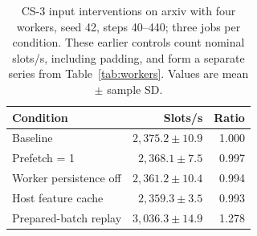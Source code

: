 \begin{table}[t]
  \centering
  \small
  \setlength{\tabcolsep}{4pt}
  \caption{CS-3 input interventions on arxiv with four workers, seed 42, steps 40--440; three jobs per condition. These earlier controls count nominal slots/s, including padding, and form a separate series from Table~\ref{tab:workers}. Values are mean $\pm$ sample SD.}
  \label{tab:interventions}
  \begin{tabular}{@{}lrr@{}}
    \hline
    Condition & Slots/s & Ratio \\
    \hline
    Baseline & $2,375.2 \pm 10.9$ & 1.000 \\
    Prefetch = 1 & $2,368.1 \pm 7.5$ & 0.997 \\
    Worker persistence off & $2,361.2 \pm 10.4$ & 0.994 \\
    Host feature cache & $2,359.3 \pm 3.5$ & 0.993 \\
    Prepared-batch replay & $3,036.3 \pm 14.9$ & 1.278 \\
    \hline
  \end{tabular}
\end{table}
